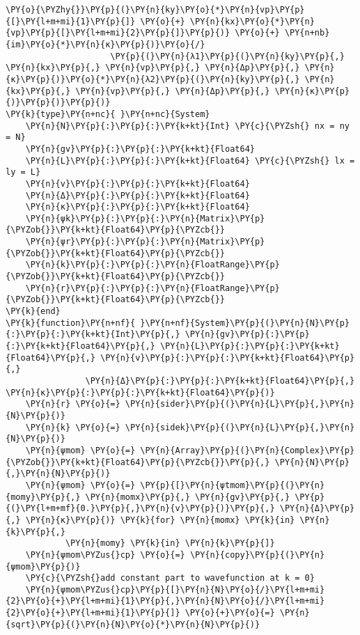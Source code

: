 \begin{Verbatim}[commandchars=\\\{\}]
                                    \PY{o}{\PYZhy{}}\PY{p}{(}\PY{n}{ky}\PY{o}{*}\PY{n}{vp}\PY{p}{[}\PY{l+m+mi}{1}\PY{p}{]} \PY{o}{+} \PY{n}{kx}\PY{o}{*}\PY{n}{vp}\PY{p}{[}\PY{l+m+mi}{2}\PY{p}{]}\PY{p}{)} \PY{o}{+} \PY{n+nb}{im}\PY{o}{*}\PY{n}{κ}\PY{p}{)}\PY{o}{/}
                     \PY{p}{(}\PY{n}{λ1}\PY{p}{(}\PY{n}{ky}\PY{p}{,} \PY{n}{kx}\PY{p}{,} \PY{n}{vp}\PY{p}{,} \PY{n}{Δp}\PY{p}{,} \PY{n}{κ}\PY{p}{)}\PY{o}{*}\PY{n}{λ2}\PY{p}{(}\PY{n}{ky}\PY{p}{,} \PY{n}{kx}\PY{p}{,} \PY{n}{vp}\PY{p}{,} \PY{n}{Δp}\PY{p}{,} \PY{n}{κ}\PY{p}{)}\PY{p}{)}\PY{p}{)}
\PY{k}{type}\PY{n+nc}{ }\PY{n+nc}{System}
    \PY{n}{N}\PY{p}{:}\PY{p}{:}\PY{k+kt}{Int} \PY{c}{\PYZsh{} nx = ny = N}
    \PY{n}{gv}\PY{p}{:}\PY{p}{:}\PY{k+kt}{Float64}
    \PY{n}{L}\PY{p}{:}\PY{p}{:}\PY{k+kt}{Float64} \PY{c}{\PYZsh{} lx = ly = L}
    \PY{n}{v}\PY{p}{:}\PY{p}{:}\PY{k+kt}{Float64}
    \PY{n}{Δ}\PY{p}{:}\PY{p}{:}\PY{k+kt}{Float64}
    \PY{n}{κ}\PY{p}{:}\PY{p}{:}\PY{k+kt}{Float64}
    \PY{n}{ψk}\PY{p}{:}\PY{p}{:}\PY{n}{Matrix}\PY{p}{\PYZob{}}\PY{k+kt}{Float64}\PY{p}{\PYZcb{}}
    \PY{n}{ψr}\PY{p}{:}\PY{p}{:}\PY{n}{Matrix}\PY{p}{\PYZob{}}\PY{k+kt}{Float64}\PY{p}{\PYZcb{}}
    \PY{n}{k}\PY{p}{:}\PY{p}{:}\PY{n}{FloatRange}\PY{p}{\PYZob{}}\PY{k+kt}{Float64}\PY{p}{\PYZcb{}}
    \PY{n}{r}\PY{p}{:}\PY{p}{:}\PY{n}{FloatRange}\PY{p}{\PYZob{}}\PY{k+kt}{Float64}\PY{p}{\PYZcb{}}
\PY{k}{end}
\PY{k}{function}\PY{n+nf}{ }\PY{n+nf}{System}\PY{p}{(}\PY{n}{N}\PY{p}{:}\PY{p}{:}\PY{k+kt}{Int}\PY{p}{,} \PY{n}{gv}\PY{p}{:}\PY{p}{:}\PY{k+kt}{Float64}\PY{p}{,} \PY{n}{L}\PY{p}{:}\PY{p}{:}\PY{k+kt}{Float64}\PY{p}{,} \PY{n}{v}\PY{p}{:}\PY{p}{:}\PY{k+kt}{Float64}\PY{p}{,}
                \PY{n}{Δ}\PY{p}{:}\PY{p}{:}\PY{k+kt}{Float64}\PY{p}{,} \PY{n}{κ}\PY{p}{:}\PY{p}{:}\PY{k+kt}{Float64}\PY{p}{)}
    \PY{n}{r} \PY{o}{=} \PY{n}{sider}\PY{p}{(}\PY{n}{L}\PY{p}{,}\PY{n}{N}\PY{p}{)}
    \PY{n}{k} \PY{o}{=} \PY{n}{sidek}\PY{p}{(}\PY{n}{L}\PY{p}{,}\PY{n}{N}\PY{p}{)}
    \PY{n}{ψmom} \PY{o}{=} \PY{n}{Array}\PY{p}{(}\PY{n}{Complex}\PY{p}{\PYZob{}}\PY{k+kt}{Float64}\PY{p}{\PYZcb{}}\PY{p}{,} \PY{n}{N}\PY{p}{,}\PY{n}{N}\PY{p}{)}
    \PY{n}{ψmom} \PY{o}{=} \PY{p}{[}\PY{n}{ψtmom}\PY{p}{(}\PY{n}{momy}\PY{p}{,} \PY{n}{momx}\PY{p}{,} \PY{n}{gv}\PY{p}{,} \PY{p}{(}\PY{l+m+mf}{0.}\PY{p}{,}\PY{n}{v}\PY{p}{)}\PY{p}{,} \PY{n}{Δ}\PY{p}{,} \PY{n}{κ}\PY{p}{)} \PY{k}{for} \PY{n}{momx} \PY{k}{in} \PY{n}{k}\PY{p}{,}
            \PY{n}{momy} \PY{k}{in} \PY{n}{k}\PY{p}{]}
    \PY{n}{ψmom\PYZus{}cp} \PY{o}{=} \PY{n}{copy}\PY{p}{(}\PY{n}{ψmom}\PY{p}{)}
    \PY{c}{\PYZsh{}add constant part to wavefunction at k = 0}
    \PY{n}{ψmom\PYZus{}cp}\PY{p}{[}\PY{n}{N}\PY{o}{/}\PY{l+m+mi}{2}\PY{o}{+}\PY{l+m+mi}{1}\PY{p}{,}\PY{n}{N}\PY{o}{/}\PY{l+m+mi}{2}\PY{o}{+}\PY{l+m+mi}{1}\PY{p}{]} \PY{o}{+}\PY{o}{=} \PY{n}{sqrt}\PY{p}{(}\PY{n}{N}\PY{o}{*}\PY{n}{N}\PY{p}{)}

\end{Verbatim}
